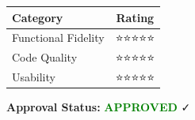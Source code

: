 \begin{table}[h]
\centering
\begin{tabular}{|l|c|}
\hline
\textbf{Category} & \textbf{Rating} \\
\hline
Functional Fidelity & ⭐⭐⭐⭐⭐ \\
Code Quality & ⭐⭐⭐⭐⭐ \\
Usability & ⭐⭐⭐⭐⭐ \\
\hline
\end{tabular}
\end{table}

\textbf{Approval Status:} \textcolor{green}{\textbf{APPROVED}} ✓

